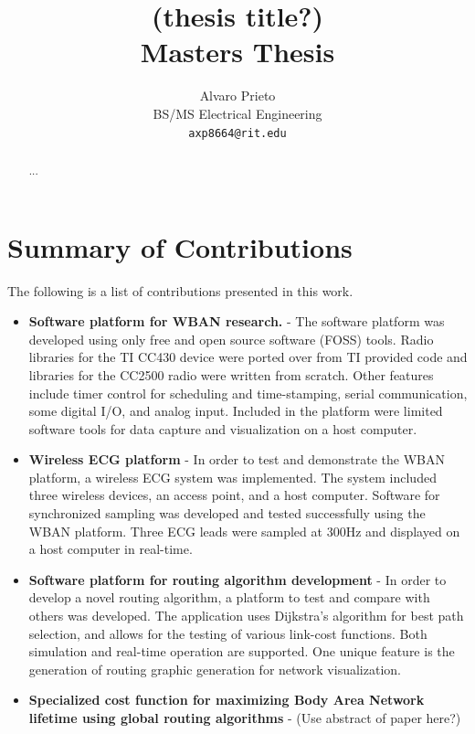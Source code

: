 \documentclass{article}
\begin{document}
\title{ (thesis title?)\\
Masters Thesis}
\author{Alvaro Prieto\\
BS/MS Electrical Engineering\\
\texttt{axp8664@rit.edu}}
\maketitle

\pagebreak

\tableofcontents

\pagebreak

\begin{abstract}
...
\end{abstract}

\section{Summary of Contributions}
The following is a list of contributions presented in this work.
\begin{itemize}
\item \textbf{Software platform for WBAN research.} - The software platform was developed using only free and open source software (FOSS) tools. Radio libraries for the TI CC430 device were ported over from TI provided code and libraries for the CC2500 radio were written from scratch. Other features include timer control for scheduling and time-stamping, serial communication, some digital I/O, and analog input. Included in the platform were limited software tools for data capture and visualization on a host computer.

\item \textbf{Wireless ECG platform} - In order to test and demonstrate the WBAN platform, a wireless ECG system was implemented. The system included three wireless devices, an access point, and a host computer. Software for synchronized sampling was developed and tested successfully using the WBAN platform. Three ECG leads were sampled at 300Hz and displayed on a host computer in real-time.

\item \textbf{Software platform for routing algorithm development} - In order to develop a novel routing algorithm, a platform to test and compare with others was developed. The application uses Dijkstra's algorithm for best path selection, and allows for the testing of various link-cost functions. Both simulation and real-time operation are supported. One unique feature is the generation of routing graphic generation for network visualization.

\item \textbf{Specialized cost function for maximizing Body Area Network lifetime using global routing algorithms} - (Use abstract of paper here?)
\end{itemize}
\end{document}
